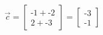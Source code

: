 \documentclass[preview]{standalone}
\begin{document}
\begin{align*}
\vec{c} = \begin{bmatrix} \text{-}1 + \text{-}2 \\ 2 + \text{-}3 \end{bmatrix}= \begin{bmatrix} \text{-}3 \\ \text{-}1 \end{bmatrix}
\end{align*}
\end{document}
